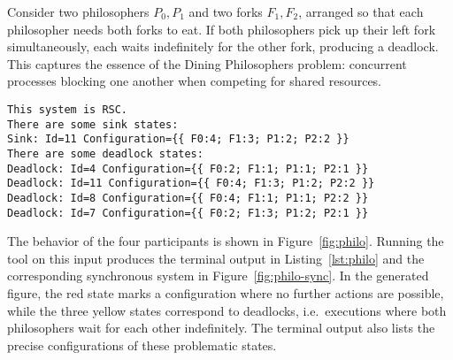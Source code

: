 \begin{example}\label{exm:philo}
Consider two philosophers $P_0, P_1$ and two forks $F_1, F_2$, arranged
so that each philosopher needs both forks to eat. If both philosophers
pick up their left fork simultaneously, each waits indefinitely for the
other fork, producing a deadlock. This captures the essence of the Dining
Philosophers problem: concurrent processes blocking one another when
competing for shared resources.

\begin{lstlisting}[language={},caption={Output of Example~\ref{exm:philo}},
    label={lst:philo}]
This system is RSC.
There are some sink states:
Sink: Id=11 Configuration={{ F0:4; F1:3; P1:2; P2:2 }}
There are some deadlock states:
Deadlock: Id=4 Configuration={{ F0:2; F1:1; P1:1; P2:1 }}
Deadlock: Id=11 Configuration={{ F0:4; F1:3; P1:2; P2:2 }}
Deadlock: Id=8 Configuration={{ F0:4; F1:1; P1:1; P2:2 }}
Deadlock: Id=7 Configuration={{ F0:2; F1:3; P1:2; P2:1 }}
\end{lstlisting}

The behavior of the four participants is shown in
Figure~\ref{fig:philo}. Running the tool on
this input produces the terminal output in
Listing~\ref{lst:philo} and the corresponding synchronous system in
Figure~\ref{fig:philo-sync}. In the
generated figure, the red state marks a configuration where no further
actions are possible, while the three yellow states correspond to
deadlocks, i.e.\ executions where both philosophers wait for each other
indefinitely. The terminal output also lists the precise configurations
of these problematic states.

\newpage


\end{example}
